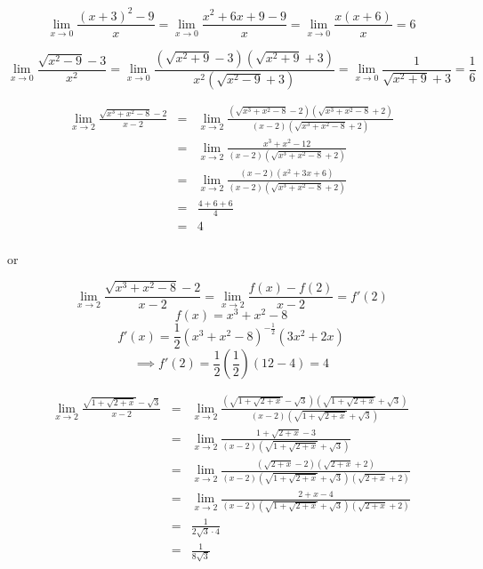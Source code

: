 \begin{eg}
$$\lim_{x \to 0} \frac{(x+3)^2 - 9}{x} = \lim_{x \to 0} \frac{x^2 + 6x+9-9}{x} = \lim_{x \to 0} \frac{x(x+6)}{x} = 6$$
\end{eg}
\begin{eg} 
$$\lim_{x \to 0} \frac{\sqrt{x^2 - 9} - 3}{x^2} = \lim_{x \to 0} \frac{(\sqrt{x^2 +9} - 3)(\sqrt{x^2 + 9} +3)}{x^2 (\sqrt{x^2 - 9} + 3)} = \lim_{x \to 0} \frac{1}{\sqrt{x^2 +9} + 3} = \frac{1}{6}$$
\end{eg}
\begin{eg}
$$\begin{array}{rcl}
\displaystyle \lim_{x \to 2} \frac{\sqrt{x^3+x^2-8}-2}{x-2} & = & \displaystyle \lim_{x \to 2} \frac{(\sqrt{x^3+x^2-8}-2)(\sqrt{x^3+x^2-8}+2)}{(x-2)(\sqrt{x^3+x^2-8}+2)}\\
& = & \displaystyle \lim_{x \to 2} \frac{x^3 + x^2 -12}{(x-2)(\sqrt{x^3+x^2-8}+2)}\\
& = & \displaystyle \lim_{x \to 2} \frac{(x-2)(x^2 +3x +6)}{(x-2)(\sqrt{x^3+x^2-8}+2)}\\
& = & \displaystyle \frac{4+6+6}{4}\\
& = & 4
\end{array}$$\\
or

$$\lim_{x \to 2} \frac{\sqrt{x^3+x^2-8}-2}{x-2} = \lim_{x \to 2} \frac{f(x) - f(2)}{x-2} = f'(2)$$
$$f(x) = x^3 +x^2 - 8$$
$$f'(x) = \frac{1}{2} (x^3 +x^2 -8)^{-\frac{1}{2}} (3 x^2 + 2x)$$
$$\implies f'(2)= \frac{1}{2} (\frac{1}{2})(12-4) = 4$$
\end{eg}
\begin{eg} 
$$\begin{array}{rcl}
\displaystyle \lim_{x \to 2} \frac{\sqrt{1+ \sqrt{2+x}} - \sqrt{3}}{x-2} & = & \displaystyle \lim_{x \to 2} \frac{(\sqrt{1+ \sqrt{2+x}} - \sqrt{3})(\sqrt{1+\sqrt{2+x}}+ \sqrt{3})}{(x-2)(\sqrt{1+\sqrt{2+x}}+ \sqrt{3})}\\
& = & \displaystyle \lim_{x \to 2} \frac{1+ \sqrt{2+x} - 3}{(x-2)(\sqrt{1+\sqrt{2+x}}+ \sqrt{3})}\\
& = & \displaystyle \lim_{x \to 2} \frac{(\sqrt{2+x} -2)(\sqrt{2+x} +2)}{(x-2)(\sqrt{1+\sqrt{2+x}}+ \sqrt{3})(\sqrt{2+x} +2)}\\
& = & \displaystyle \lim_{x \to 2} \frac{2+x-4}{(x-2)(\sqrt{1+\sqrt{2+x}}+ \sqrt{3})(\sqrt{2+x} +2)}\\
& = & \displaystyle \frac{1}{2\sqrt{3} \cdot 4}\\
& = & \displaystyle \frac{1}{8\sqrt{3}}
\end{array}$$
\end{eg}

